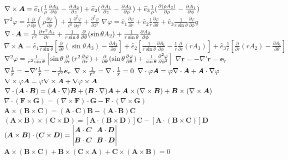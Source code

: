 \documentclass[UTF8,8pt]{ctexart}
\begin{document}
\begin{multicols}{3}
    $ { \nabla \times \bm{ A } } =\hat e_1 (\ff{\rho} \frac { \partial A_3} { \partial \phi } - \frac { \partial A _ { 2 } } { \partial z } ) + \hat { e } _ { 2 } ( \frac { \partial A _ { 1 } } { \partial z } - \frac { \partial A _ { 3 } } { \partial \rho } ) + \hat { e } _ { 3 } \frac { 1 } { \rho } ( \frac { \partial ( \rho A _ { 2 } ) } { \partial \rho } - \frac { \partial A _ { 1 } } { \partial \phi } )$
    $\nabla ^ { 2 } \varphi = \frac { 1 } { \rho } \frac { \partial } { \partial \rho } ( \rho \frac { \partial \varphi } { \partial \rho } ) + \frac { 1 } { \rho ^ { 2 } } \frac { \partial ^ { 2 } \varphi } { \partial \phi ^ { 2 } } + \frac { \partial ^ { 2 } \varphi } { \partial z ^ { 2 } }$
    $\nabla \varphi = \hat { e } _ { 1 } \frac { \partial \varphi } { \partial r } + \hat { e } _ { 2 } \frac { 1 } { r } \frac { \partial \varphi } { \partial \theta } + \hat { e } _ { 3 } \frac { 1 } { r \sin \theta } \frac { \partial \varphi } { \partial \phi }q$
    $\nabla \cdot \bm{ A } = \ff{r^2} \pp{r^2A_1}{r} + \frac { 1 } { r \sin \theta } \frac { \partial } { \partial \theta } ( \sin \theta A _ { 2 } ) + \frac { 1 } { r \sin \theta } \frac { \partial A _ { 3 } } { \partial \phi }$
    $\nabla \times \bm{ A }  = 
    \hat { e } _ { 1 } \frac { 1 } { r \sin \theta } \left[ \frac { \partial } { \partial \theta } ( \sin \theta A _ { 3 } ) - \frac { \partial A _ { 2 } } { \partial \phi } \right]  
    + \hat { e } _ { 2 } \left[ \frac { 1 } { r \sin \theta } \frac { \partial A _ { 1 } } { \partial \phi } - \frac { 1 } { r } \frac { \partial } { \partial r } ( r A _ { 3 } ) \right] 
    + \hat { e } _ { 3 } \frac { 1 } { r } \left[ \frac { \partial } { \partial r } ( r A _ { 2 } ) - \frac { \partial A _ { 1 } } { \partial \theta } \right] $
    $\nabla^2\varphi=\ff{r^2\sin\t}\left[\sin\t\pp{}{r}(r^2\pp{\varphi}{r})+\pp{}{\t}(\sin\t\pp{\varphi}{\t})+\ff{\sin\t}\pp[2]{\varphi}{\phi}\right]$
    $\nabla\bm{r}=-\nabla'\bm{r}=\bm{e}_r$
    $\nabla\ff{\bm{r}}=-\nabla'\ff{\bm{r}}=-\ff{r^2}\bm{e}_r$
    $\curl\ff{\bm{r}^2}=\div\ff{\bm{r}}=0$
    $\div\vp\bm{A}=\vp\div\bm{A}+\bm{A}\cdot\grad\vp$
    $\curl\vp\bm{A}=\vp\curl\bm{A}+\grad\vp\times\bm{A}$
    $\div(\bm{A}\cdot\bm{B}) = (\bm{A}\cdot\nabla)\bm{B}+(\bm{B}\cdot\nabla)\bm{A}+\bm{A}\tm(\curl\bm{B})+\bm{B}\tm(\curl\bm{A})$
    $\nabla\cdot(\bm{F} \times \bm{G})=(\nabla\times \bm{F})\cdot \bm{G}-\bm{F}\cdot(\nabla\times \bm{G})$
    $\bm{A}\times(\bm{B}\times\bm{C})=(\bm{A}\cdot\bm{C})\bm{B}-(\bm{A}\cdot\bm{B})\bm{C}$
    $( \bm{ A } \times \bm{ B } ) \times ( \bm{ C } \times \bm{ D } ) = [ \bm{ A } \cdot ( \bm{ B } \times \bm{ D } ) ] \bm{ C } - [ \bm{ A } \cdot ( \bm{ B } \times \bm{ C } ) ] \bm{ D }$
    $( \bm{ A } \times \bm{ B } ) \cdot ( \bm{ C } \times \bm{ D } ) = \abs{\ar{\bm{A}\cdot\bm{C}&\ \ \bm{A}\cdot\bm{D}\\
    \bm{B}\cdot\bm{C}&\ \ \bm{B}\cdot\bm{D}}}$
    $\bm{ A } \times ( \bm{ B } \times \bm{ C } ) + \bm{ B } \times ( \bm{ C } \times \bm{ A } ) + \bm{ C } \times ( \bm{ A } \times \bm{ B } ) = 0$
    \end{multicols}
\end{document}
